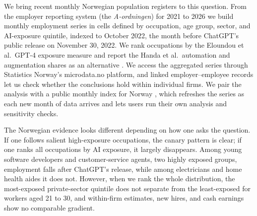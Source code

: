 \documentclass[12pt]{article}
\begin{document}
We bring recent monthly Norwegian population registers to this question. From the employer reporting system (the \emph{A-ordningen}) for 2021 to 2026 we build monthly employment series in cells defined by occupation, age group, sector, and AI-exposure quintile, indexed to October 2022, the month before ChatGPT's public release on November 30, 2022. We rank occupations by the Eloundou et al.\ GPT-4 exposure measure \citep{eloundou2024} and report the Handa et al.\ automation and augmentation shares as an alternative \citep{handa2025}. We access the aggregated series through Statistics Norway's microdata.no platform, and linked employer--employee records let us check whether the conclusions hold within individual firms. We pair the analysis with a public monthly index for Norway \citep{kiindeksen2026}, which refreshes the series as each new month of data arrives and lets users run their own analysis and sensitivity checks.

The Norwegian evidence looks different depending on how one asks the question. If one follows salient high-exposure occupations, the canary pattern is clear; if one ranks all occupations by AI exposure, it largely disappears. Among young software developers and customer-service agents, two highly exposed groups, employment falls after ChatGPT's release, while among electricians and home health aides it does not. However, when we rank the whole distribution, the most-exposed private-sector quintile does not separate from the least-exposed for workers aged 21 to 30, and within-firm estimates, new hires, and cash earnings show no comparable gradient. 
\end{document}
